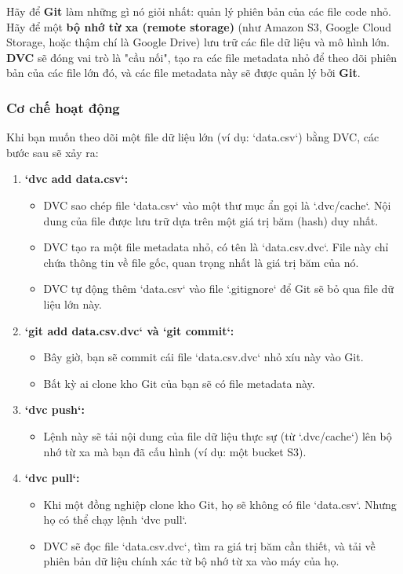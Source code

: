 \begin{tcolorbox}[
    title=Triết lý của DVC,
    colback=blue!5!white, colframe=blue!75!black, fonttitle=\bfseries
]
Hãy để \textbf{Git} làm những gì nó giỏi nhất: quản lý phiên bản của các file code nhỏ. Hãy để một \textbf{bộ nhớ từ xa (remote storage)} (như Amazon S3, Google Cloud Storage, hoặc thậm chí là Google Drive) lưu trữ các file dữ liệu và mô hình lớn. \textbf{DVC} sẽ đóng vai trò là "cầu nối", tạo ra các file metadata nhỏ để theo dõi phiên bản của các file lớn đó, và các file metadata này sẽ được quản lý bởi \textbf{Git}.
\end{tcolorbox}

\subsubsection{Cơ chế hoạt động}
Khi bạn muốn theo dõi một file dữ liệu lớn (ví dụ: `data.csv`) bằng DVC, các bước sau sẽ xảy ra:
\begin{enumerate}
    \item \textbf{`dvc add data.csv`:}
        \begin{itemize}
            \item DVC sao chép file `data.csv` vào một thư mục ẩn gọi là `.dvc/cache`. Nội dung của file được lưu trữ dựa trên một giá trị băm (hash) duy nhất.
            \item DVC tạo ra một file metadata nhỏ, có tên là `data.csv.dvc`. File này chỉ chứa thông tin về file gốc, quan trọng nhất là giá trị băm của nó.
            \item DVC tự động thêm `data.csv` vào file `.gitignore` để Git sẽ bỏ qua file dữ liệu lớn này.
        \end{itemize}
    \item \textbf{`git add data.csv.dvc` và `git commit`:}
        \begin{itemize}
            \item Bây giờ, bạn sẽ commit cái file `data.csv.dvc` nhỏ xíu này vào Git.
            \item Bất kỳ ai clone kho Git của bạn sẽ có file metadata này.
        \end{itemize}
    \item \textbf{`dvc push`:}
        \begin{itemize}
            \item Lệnh này sẽ tải nội dung của file dữ liệu thực sự (từ `.dvc/cache`) lên bộ nhớ từ xa mà bạn đã cấu hình (ví dụ: một bucket S3).
        \end{itemize}
    \item \textbf{`dvc pull`:}
        \begin{itemize}
            \item Khi một đồng nghiệp clone kho Git, họ sẽ không có file `data.csv`. Nhưng họ có thể chạy lệnh `dvc pull`.
            \item DVC sẽ đọc file `data.csv.dvc`, tìm ra giá trị băm cần thiết, và tải về phiên bản dữ liệu chính xác từ bộ nhớ từ xa vào máy của họ.
        \end{itemize}
\end{enumerate}

